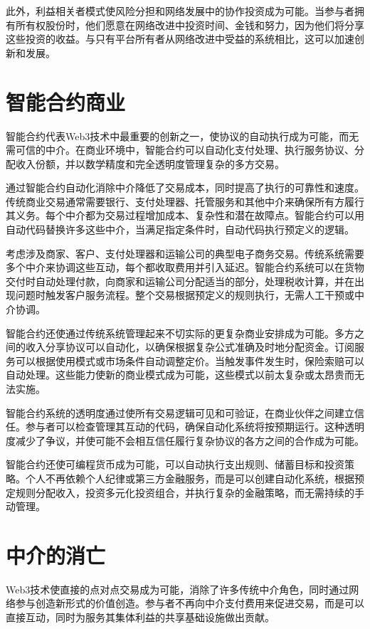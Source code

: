 \documentclass[
  Letterpaper,
]{scrbook}
\begin{document}
此外，利益相关者模式使风险分担和网络发展中的协作投资成为可能。当参与者拥有所有权股份时，他们愿意在网络改进中投资时间、金钱和努力，因为他们将分享这些投资的收益。与只有平台所有者从网络改进中受益的系统相比，这可以加速创新和发展。

\section{智能合约商业}\label{ux667aux80fdux5408ux7ea6ux5546ux4e1a}

智能合约代表Web3技术中最重要的创新之一，使协议的自动执行成为可能，而无需可信的中介。在商业环境中，智能合约可以自动化支付处理、执行服务协议、分配收入份额，并以数学精度和完全透明度管理复杂的多方交易。

通过智能合约自动化消除中介降低了交易成本，同时提高了执行的可靠性和速度。传统商业交易通常需要银行、支付处理器、托管服务和其他中介来确保所有方履行其义务。每个中介都为交易过程增加成本、复杂性和潜在故障点。智能合约可以用自动代码替换许多这些中介，当满足指定条件时，自动代码执行预定义的逻辑。

考虑涉及商家、客户、支付处理器和运输公司的典型电子商务交易。传统系统需要多个中介来协调这些互动，每个都收取费用并引入延迟。智能合约系统可以在货物交付时自动处理付款，向商家和运输公司分配适当的部分，处理税收计算，并在出现问题时触发客户服务流程。整个交易根据预定义的规则执行，无需人工干预或中介协调。

智能合约还使通过传统系统管理起来不切实际的更复杂商业安排成为可能。多方之间的收入分享协议可以自动化，以确保根据复杂公式准确及时地分配资金。订阅服务可以根据使用模式或市场条件自动调整定价。当触发事件发生时，保险索赔可以自动处理。这些能力使新的商业模式成为可能，这些模式以前太复杂或太昂贵而无法实施。

智能合约系统的透明度通过使所有交易逻辑可见和可验证，在商业伙伴之间建立信任。参与者可以检查管理其互动的代码，确保自动化系统将按预期运行。这种透明度减少了争议，并使可能不会相互信任履行复杂协议的各方之间的合作成为可能。

智能合约还使可编程货币成为可能，可以自动执行支出规则、储蓄目标和投资策略。个人不再依赖个人纪律或第三方金融服务，而是可以创建自动化系统，根据预定规则分配收入，投资多元化投资组合，并执行复杂的金融策略，而无需持续的手动管理。

\section{中介的消亡}\label{ux4e2dux4ecbux7684ux6d88ux4ea1}

Web3技术使直接的点对点交易成为可能，消除了许多传统中介角色，同时通过网络参与创造新形式的价值创造。参与者不再向中介支付费用来促进交易，而是可以直接互动，同时为服务其集体利益的共享基础设施做出贡献。
\end{document}

